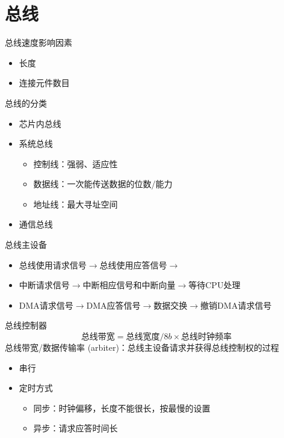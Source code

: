 
\section{总线}
总线速度影响因素
\begin{itemize}
	\item 长度
	\item 连接元件数目
\end{itemize}
总线的分类
\begin{itemize}
	\item 芯片内总线
	\item 系统总线
	\begin{itemize}
		\item 控制线：强弱、适应性
		\item 数据线：一次能传送数据的位数/能力
		\item 地址线：最大寻址空间
	\end{itemize}
	\item 通信总线
\end{itemize}
总线主设备
\begin{itemize}
	\item 总线使用请求信号$\to$总线使用应答信号$\to$
	\item 中断请求信号$\to$中断相应信号和中断向量$\to$等待CPU处理
	\item DMA请求信号$\to$DMA应答信号$\to$数据交换$\to$撤销DMA请求信号
\end{itemize}
总线控制器
\[\text{总线带宽}=\text{总线宽度}/8b\times\text{总线时钟频率}\]
总线带宽/数据传输率
(arbiter)：总线主设备请求并获得总线控制权的过程
\begin{itemize}
	\item 串行
	\item 定时方式
	\begin{itemize}
		\item 同步：时钟偏移，长度不能很长，按最慢的设置
		\item 异步：请求应答时间长
	\end{itemize}
\end{itemize}